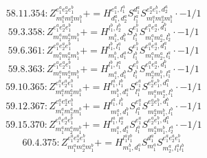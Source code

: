 \documentclass[letterpaper,10pt,fleqn,leqno,onecolumn]{article}
\begin{document}
\begin{equation} \;\;\;\;\;\;  58.11.354: Z^{e_{1}^{a}e_{2}^{a}e_{1}^{b}}_{m_{1}^{a}m_{2}^{a}m_{1}^{b}}+=H^{e_{1}^{a},l_{1}^{a}}_{d_{1}^{a},d_{2}^{a}}S^{d_{1}^{a}}_{l_{1}^{a}}S^{e_{2}^{a}e_{1}^{b},d_{2}^{a}}_{m_{1}^{a}m_{2}^{a}m_{1}^{b}}\cdot -1/1 \end{equation}
\begin{equation} \;\;\;\;\;\;  59.3.358: Z^{e_{1}^{a}e_{2}^{a}e_{1}^{b}}_{m_{1}^{a}m_{2}^{a}m_{1}^{b}}+=H^{l_{1}^{b},l_{2}^{b}}_{m_{1}^{b},d_{1}^{b}}S^{e_{1}^{b}}_{l_{1}^{b}}S^{e_{1}^{a}e_{2}^{a},d_{1}^{b}}_{m_{1}^{a}m_{2}^{a},l_{2}^{b}}\cdot -1/1 \end{equation}
\begin{equation} \;\;\;\;\;\;  59.6.361: Z^{e_{1}^{a}e_{2}^{a}e_{1}^{b}}_{m_{1}^{a}m_{2}^{a}m_{1}^{b}}+=H^{l_{1}^{b},l_{1}^{a}}_{m_{1}^{b},d_{1}^{a}}S^{e_{1}^{b}}_{l_{1}^{b}}S^{e_{1}^{a}e_{2}^{a},d_{1}^{a}}_{m_{1}^{a}m_{2}^{a},l_{1}^{a}}\cdot -1/1 \end{equation}
\begin{equation} \;\;\;\;\;\;  59.8.363: Z^{e_{1}^{a}e_{2}^{a}e_{1}^{b}}_{m_{1}^{a}m_{2}^{a}m_{1}^{b}}+=H^{l_{1}^{b},l_{1}^{a}}_{m_{1}^{a},d_{1}^{b}}S^{e_{1}^{b}}_{l_{1}^{b}}S^{e_{1}^{a}e_{2}^{a},d_{1}^{b}}_{m_{2}^{a}m_{1}^{b},l_{1}^{a}}\cdot -1/1 \end{equation}
\begin{equation} \;\;\;\;\;\;  59.10.365: Z^{e_{1}^{a}e_{2}^{a}e_{1}^{b}}_{m_{1}^{a}m_{2}^{a}m_{1}^{b}}+=H^{l_{1}^{a},l_{1}^{b}}_{m_{1}^{b},d_{1}^{a}}S^{e_{1}^{a}}_{l_{1}^{a}}S^{e_{2}^{a}e_{1}^{b},d_{1}^{a}}_{m_{1}^{a}m_{2}^{a},l_{1}^{b}}\cdot -1/1 \end{equation}
\begin{equation} \;\;\;\;\;\;  59.12.367: Z^{e_{1}^{a}e_{2}^{a}e_{1}^{b}}_{m_{1}^{a}m_{2}^{a}m_{1}^{b}}+=H^{l_{1}^{a},l_{1}^{b}}_{m_{1}^{a},d_{1}^{b}}S^{e_{1}^{a}}_{l_{1}^{a}}S^{e_{2}^{a}e_{1}^{b},d_{1}^{b}}_{m_{2}^{a}m_{1}^{b},l_{1}^{b}}\cdot -1/1 \end{equation}
\begin{equation} \;\;\;\;\;\;  59.15.370: Z^{e_{1}^{a}e_{2}^{a}e_{1}^{b}}_{m_{1}^{a}m_{2}^{a}m_{1}^{b}}+=H^{l_{1}^{a},l_{2}^{a}}_{m_{1}^{a},d_{1}^{a}}S^{e_{1}^{a}}_{l_{1}^{a}}S^{e_{2}^{a}e_{1}^{b},d_{1}^{a}}_{m_{2}^{a}m_{1}^{b},l_{2}^{a}}\cdot -1/1 \end{equation}
\begin{equation} \;\;\;\;\;\;  60.4.375: Z^{e_{1}^{a}e_{2}^{a}e_{1}^{b}}_{m_{1}^{a}m_{2}^{a}m_{1}^{b}}+=H^{l_{1}^{a}l_{1}^{b}}_{m_{1}^{b},d_{1}^{a}}S^{d_{1}^{a}}_{m_{1}^{a}}S^{e_{1}^{a}e_{2}^{a}e_{1}^{b}}_{m_{2}^{a},l_{1}^{a}l_{1}^{b}} \end{equation}
\end{document}
